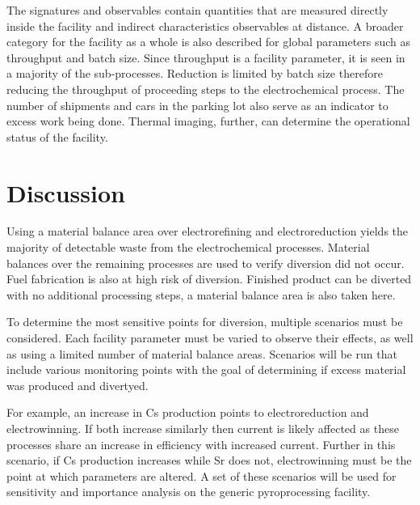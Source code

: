 \documentclass{anstrans}
\begin{document}
The signatures and observables contain quantities that are measured directly inside
the facility and indirect characteristics observables at distance. A broader category for the facility as a whole is also described for global parameters such as
throughput and batch size. Since throughput is a facility parameter, 
it is seen in a majority of the sub-processes. Reduction is limited by 
batch size therefore reducing the throughput of proceeding steps to the 
electrochemical process. The number of shipments and cars in the parking lot also serve as an indicator to excess work being done. Thermal imaging, further, can
determine the operational status of the facility. 


\section{Discussion}
Using a material balance area over electrorefining and electroreduction yields the majority of detectable waste from 
the electrochemical processes.  Material balances over the remaining 
processes are used to verify diversion did not occur. Fuel fabrication is also at high risk of diversion. Finished product can be diverted with no additional 
processing steps, a material balance area is also taken here. 

To determine the most sensitive points for diversion, multiple scenarios must be considered. 
Each facility parameter must be varied to observe their effects, as well as using a limited number of material balance areas. 
Scenarios will be run that include various monitoring points with the goal of determining if excess material was produced 
and divertyed. 

For example, an increase in Cs production points to electroreduction and electrowinning. 
If both increase similarly then current is likely affected as these processes share an increase in efficiency with increased 
current. Further in this scenario, if Cs production increases while Sr does not, electrowinning must be the point at which 
parameters are altered. A set of these scenarios will be used for sensitivity and importance analysis on the generic 
pyroprocessing facility.

\end{document}
